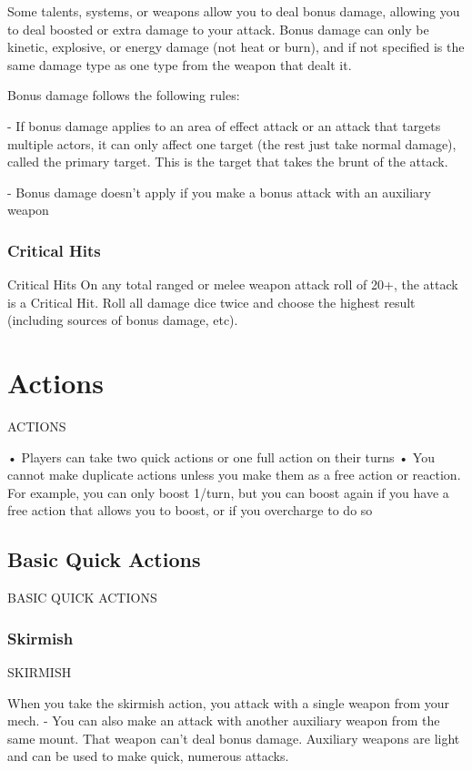 Some talents, systems, or weapons allow you to deal bonus damage, allowing you to deal  
boosted or extra damage to your attack. Bonus damage can only be kinetic, explosive, or energy  
damage (not heat or burn), and if not specified is the same damage type as one type from the  
weapon that dealt it.
 

Bonus damage follows the following rules:
 
         	- If bonus damage applies to an area of effect attack or an attack that targets multiple  
         actors, it can only affect one target (the rest just take normal damage), called the primary  
         target. This is the target that takes the brunt of the attack.
 
         	- Bonus damage doesn’t apply if you make a bonus attack with an auxiliary weapon  

\subsection{Critical Hits}
                                                Critical Hits  
On any total ranged or melee weapon attack roll of 20+, the attack is a Critical Hit. Roll all  
damage dice twice and choose the highest result (including sources of bonus damage, etc).
 
\chapter{Actions}
 ACTIONS  

•   Players can take two quick actions or one full action on their turns  
•   You cannot make duplicate actions unless you make them as a free action or reaction. For  
    example, you can only boost 1/turn, but you can boost again if you have a free action that  
    allows you to boost, or if you overcharge to do so  
    
\section{Basic Quick Actions}

                       BASIC QUICK ACTIONS  
\subsection{Skirmish}

                                             SKIRMISH  

When you take the skirmish action, you attack with a single weapon from your mech.   
        - You can also make an attack with another auxiliary weapon from the same mount. That  
        weapon can’t deal bonus damage. Auxiliary weapons are light and can be used to make  
        quick, numerous attacks.
 
